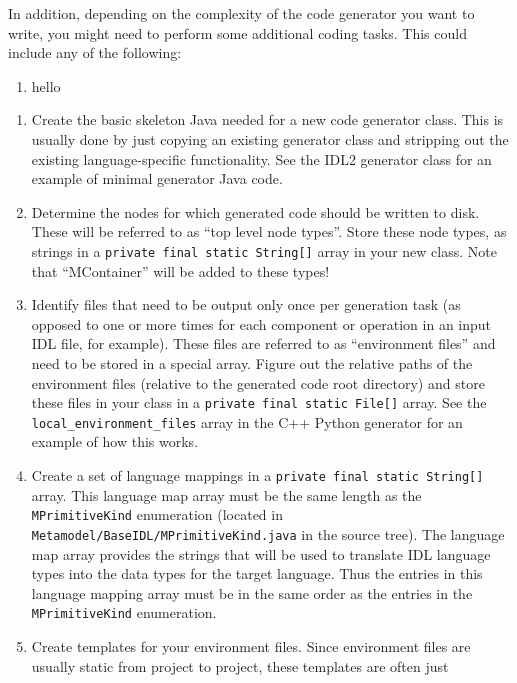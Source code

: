 In addition, depending on the complexity of the code generator you want to
write, you might need to perform some additional coding tasks. This could
include any of the following:

\begin{enumerate}
\item hello
\end{enumerate}

\begin{enumerate}
\item Create the basic skeleton Java needed for a new code generator class. This
      is usually done by just copying an existing generator class and stripping
      out the existing language-specific functionality. See the IDL2 generator
      class for an example of minimal generator Java code.
\item Determine the nodes for which generated code should be written to disk.
      These will be referred to as ``top level node types''. Store these node
      types, as strings in a {\tt private final static String[]} array in your
      new class. Note that ``MContainer'' will be added to these types!
\item Identify files that need to be output only once per generation task (as
      opposed to one or more times for each component or operation in an input
      IDL file, for example). These files are referred to as ``environment
      files'' and need to be stored in a special array. Figure out the relative
      paths of the environment files (relative to the generated code root
      directory) and store these files in your class in a {\tt private final
      static File[]} array. See the {\tt local\_environment\_files} array in the
      C++ Python generator for an example of how this works.
\item Create a set of language mappings in a {\tt private final static String[]}
      array. This language map array must be the same length as the {\tt
      MPrimitiveKind} enumeration (located in {\tt
      Metamodel/BaseIDL/MPrimitiveKind.java} in the source tree). The language
      map array provides the strings that will be used to translate IDL language
      types into the data types for the target language. Thus the entries in
      this language mapping array must be in the same order as the entries in
      the {\tt MPrimitiveKind} enumeration.
\item Create templates for your environment files. Since environment files are
      usually static from project to project, these templates are often just

\end{enumerate}
